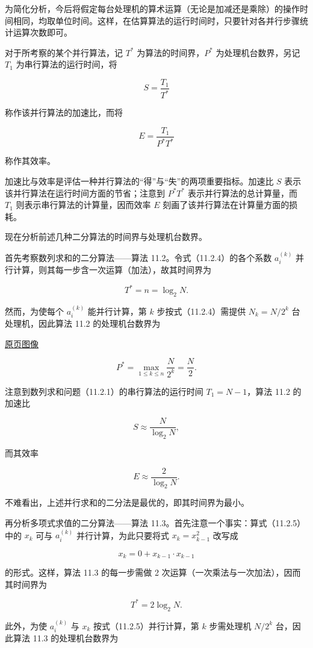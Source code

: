 \documentclass[
  10pt,
  fontset=fandol]{ctexart}
\begin{document}
为简化分析，今后将假定每台处理机的算术运算（无论是加减还是乘除）的操作时间相同，均取单位时间。这样，在估算算法的运行时间时，只要针对各并行步骤统计运算次数即可。

对于所考察的某个并行算法，记 \(T^*\) 为算法的时间界，\(P^*\) 为处理机台数界，另记 \(T_1\) 为串行算法的运行时间，将

\[
S=\frac{T_1}{T^*}
\]

称作该并行算法的加速比，而将

\[
E=\frac{T_1}{P^*T^*}
\]

称作其效率。

加速比与效率是评估一种并行算法的``得''与``失''的两项重要指标。加速比 \(S\) 表示该并行算法在运行时间方面的节省；注意到 \(P^*T^*\) 表示并行算法的总计算量，而 \(T_1\) 则表示串行算法的计算量，因而效率 \(E\) 刻画了该并行算法在计算量方面的损耗。

现在分析前述几种二分算法的时间界与处理机台数界。

首先考察数列求和的二分算法------算法 11.2。令式（11.2.4）的各个系数 \(a_i^{(k)}\) 并行计算，则其每一步含一次运算（加法），故其时间界为

\[
T^*=n=\log_2 N.
\]

然而，为使每个 \(a_i^{(k)}\) 能并行计算，第 \(k\) 步按式（11.2.4）需提供 \(N_k=N/2^k\) 台处理机，因此算法 11.2 的处理机台数界为

\href{../../source-images/pdf-284.jpeg}{原页图像}

\[
P^*=\max_{1\le k\le n}\frac{N}{2^k}=\frac{N}{2}.
\]

注意到数列求和问题（11.2.1）的串行算法的运行时间 \(T_1=N-1\)，算法 11.2 的加速比

\[
S\approx\frac{N}{\log_2 N},
\]

而其效率

\[
E\approx\frac{2}{\log_2 N}.
\]

不难看出，上述并行求和的二分法是最优的，即其时间界为最小。

再分析多项式求值的二分算法------算法 11.3。首先注意一个事实：算式（11.2.5）中的 \(x_k\) 可与 \(a_i^{(k)}\) 并行计算，为此只要将式 \(x_k=x_{k-1}^2\) 改写成

\[
x_k=0+x_{k-1}\cdot x_{k-1}
\]

的形式。这样，算法 11.3 的每一步需做 2 次运算（一次乘法与一次加法），因而其时间界为

\[
T^*=2\log_2 N.
\]

此外，为使 \(a_i^{(k)}\) 与 \(x_k\) 按式（11.2.5）并行计算，第 \(k\) 步需处理机 \(N/2^k\) 台，因此算法 11.3 的处理机台数界为
\end{document}
